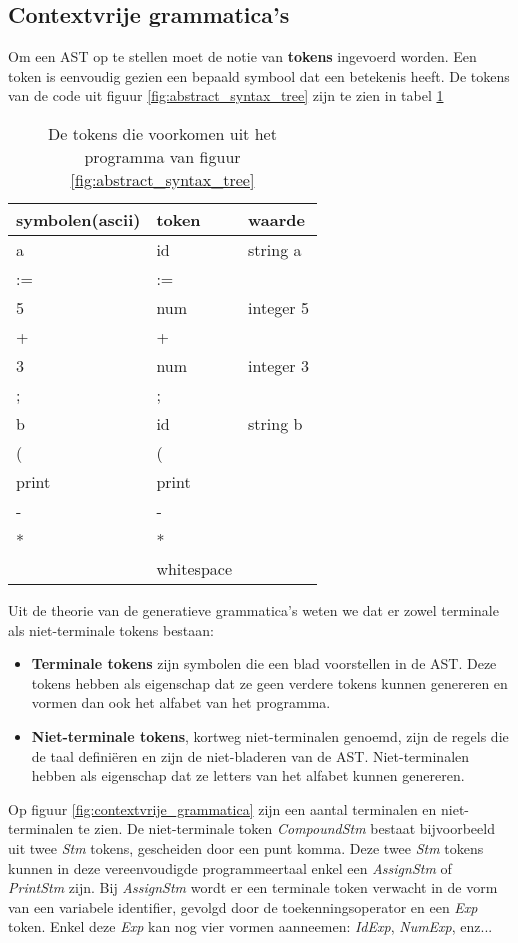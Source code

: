 \subsection{Contextvrije grammatica's}
Om een AST op te stellen moet de notie van \textbf{tokens} ingevoerd worden. Een token is eenvoudig gezien een bepaald symbool dat een betekenis heeft. De tokens van de code uit figuur \ref{fig:abstract_syntax_tree} zijn te zien in tabel \ref{table:tokens}
\begin{table}[h]
	\centering
	\begin{tabular}{l | l | l}
		symbolen(ascii) & token & waarde \\
		\hline
		a & id & string a \\
		:= & := & \\
		5 & num & integer 5 \\
		+ & + & \\
		3 & num & integer 3 \\
		; & ; & \\
		b & id & string b \\
		( & ( & \\
		print & print & \\
		- & - & \\
		* & * & \\
		  & whitespace & \\
	\end{tabular}
	\caption{De tokens die voorkomen uit het programma van figuur \ref{fig:abstract_syntax_tree}}
	\label{table:tokens}
\end{table}
Uit de theorie van de generatieve grammatica's weten we dat er zowel terminale als niet-terminale tokens bestaan:
\begin{itemize}
	\item \textbf{Terminale tokens} zijn symbolen die een blad voorstellen in de AST. Deze tokens hebben als eigenschap dat ze geen verdere tokens kunnen genereren en vormen dan ook het alfabet van het programma.
	\item \textbf{Niet-terminale tokens}, kortweg niet-terminalen genoemd, zijn de regels die de taal definiëren en zijn de niet-bladeren van de AST. Niet-terminalen hebben als eigenschap dat ze letters van het alfabet kunnen genereren.
\end{itemize}
Op figuur \ref{fig:contextvrije_grammatica} zijn een aantal terminalen en niet-terminalen te zien. De niet-terminale token \textit{CompoundStm} bestaat bijvoorbeeld uit twee \textit{Stm} tokens, gescheiden door een punt komma. Deze twee \textit{Stm} tokens kunnen in deze vereenvoudigde programmeertaal enkel een \textit{AssignStm} of \textit{PrintStm} zijn. Bij \textit{AssignStm} wordt er een terminale token verwacht in de vorm van een variabele identifier, gevolgd door de toekenningsoperator en een \textit{Exp} token. Enkel deze \textit{Exp} kan nog vier vormen aanneemen: \textit{IdExp}, \textit{NumExp}, enz...
